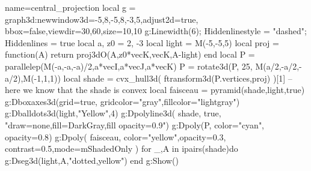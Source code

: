 \documentclass[border=5pt]{standalone}%
\begin{document}
%
\begin{luadraw}{name=central_projection}
local g = graph3d:new{window3d={-5,8,-5,8,-3,5},adjust2d=true, bbox=false,viewdir={30,60},size={10,10}}
g:Linewidth(6); Hiddenlinestyle = "dashed"; Hiddenlines = true
local a, z0 = 2, -3
local light = M(-5,-5,5)
local proj = function(A)
    return proj3dO(A,{z0*vecK,vecK},A-light)
end
local P = parallelep(M(-a,-a,-a)/2,a*vecI,a*vecJ,a*vecK)
P = rotate3d(P, 25, {M(a/2,-a/2,-a/2),M(-1,1,1)})
local shade = cvx_hull3d( ftransform3d(P.vertices,proj) )[1] -- here we know that the shade is convex
local faisceau = pyramid(shade,light,true)
g:Dboxaxes3d({grid=true, gridcolor="gray",fillcolor="lightgray"})
g:Dballdots3d(light,"Yellow",4)
g:Dpolyline3d( shade, true, "draw=none,fill=DarkGray,fill opacity=0.9") 
g:Dpoly(P, {color="cyan", opacity=0.8})
g:Dpoly( faisceau, {color="yellow",opacity=0.3, contrast=0.5,mode=mShadedOnly} )
for _,A in ipairs(shade)do
    g:Dseg3d({light,A},"dotted,yellow")
end
g:Show()
\end{luadraw}
\end{document}
